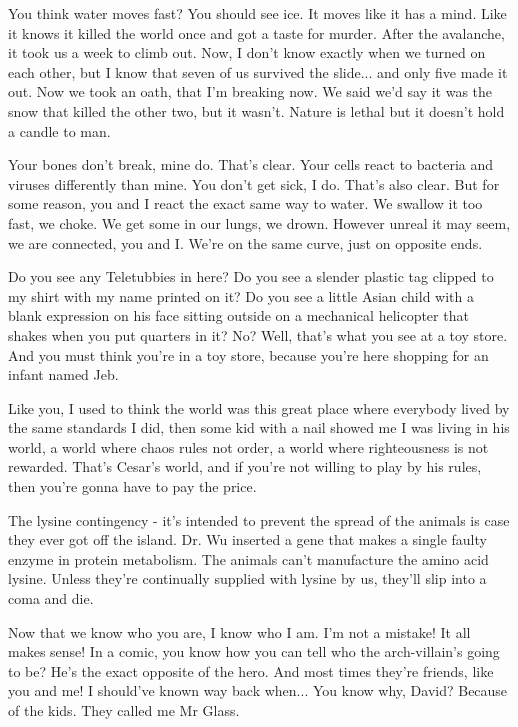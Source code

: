 \documentclass{book}
\begin{document}
You think water moves fast? You should see ice. It moves like it has a mind. Like it knows it killed the world once and got a taste for murder. After the avalanche, it took us a week to climb out. Now, I don't know exactly when we turned on each other, but I know that seven of us survived the slide... and only five made it out. Now we took an oath, that I'm breaking now. We said we'd say it was the snow that killed the other two, but it wasn't. Nature is lethal but it doesn't hold a candle to man.

Your bones don't break, mine do. That's clear. Your cells react to bacteria and viruses differently than mine. You don't get sick, I do. That's also clear. But for some reason, you and I react the exact same way to water. We swallow it too fast, we choke. We get some in our lungs, we drown. However unreal it may seem, we are connected, you and I. We're on the same curve, just on opposite ends.

Do you see any Teletubbies in here? Do you see a slender plastic tag clipped to my shirt with my name printed on it? Do you see a little Asian child with a blank expression on his face sitting outside on a mechanical helicopter that shakes when you put quarters in it? No? Well, that's what you see at a toy store. And you must think you're in a toy store, because you're here shopping for an infant named Jeb.

Like you, I used to think the world was this great place where everybody lived by the same standards I did, then some kid with a nail showed me I was living in his world, a world where chaos rules not order, a world where righteousness is not rewarded. That's Cesar's world, and if you're not willing to play by his rules, then you're gonna have to pay the price.

The lysine contingency - it's intended to prevent the spread of the animals is case they ever got off the island. Dr. Wu inserted a gene that makes a single faulty enzyme in protein metabolism. The animals can't manufacture the amino acid lysine. Unless they're continually supplied with lysine by us, they'll slip into a coma and die.

Now that we know who you are, I know who I am. I'm not a mistake! It all makes sense! In a comic, you know how you can tell who the arch-villain's going to be? He's the exact opposite of the hero. And most times they're friends, like you and me! I should've known way back when... You know why, David? Because of the kids. They called me Mr Glass.
\end{document}

